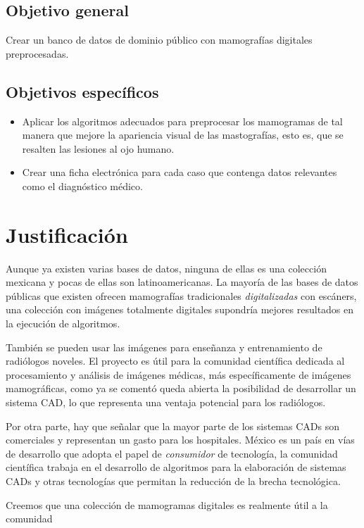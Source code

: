 \subsection{Objetivo general} 

Crear un banco de datos de dominio público con mamografías digitales
preprocesadas.

\subsection{Objetivos específicos}

\begin{itemize}
    \item Aplicar los algoritmos adecuados para preprocesar los mamogramas de
    tal manera que mejore la apariencia visual de las mastografías, esto es, que
    se resalten las lesiones al ojo humano.
    \item Crear una ficha electrónica para cada caso que contenga datos
    relevantes como el diagnóstico médico.
\end{itemize}

\section{Justificación}

Aunque ya existen varias bases de datos, ninguna de ellas es una colección
mexicana y pocas de ellas son latinoamericanas. La mayoría de las bases de
datos públicas que existen ofrecen mamografías tradicionales
\textit{digitalizadas} con escáners, una colección con imágenes totalmente
digitales supondría mejores resultados en la ejecución de algoritmos.

También se pueden usar las imágenes para enseñanza y entrenamiento de
radiólogos noveles. El proyecto es útil para la comunidad científica dedicada
al procesamiento y análisis de imágenes médicas, más específicamente de
imágenes mamográficas, como ya se comentó queda abierta la posibilidad de
desarrollar un sistema CAD, lo que representa una ventaja potencial para los
radiólogos.

Por otra parte, hay que señalar que la mayor parte de los sistemas CADs son
comerciales y representan un gasto para los hospitales. México es un país en
vías de desarrollo que adopta el papel de \textit{consumidor} de tecnología, la
comunidad científica trabaja en el desarrollo de algoritmos para la elaboración
de sistemas CADs y otras tecnologías que permitan la reducción de la brecha
tecnológica.

Creemos que una colección de mamogramas digitales es realmente útil a la
comunidad
